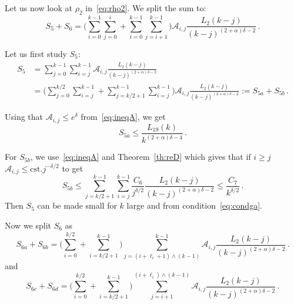 \documentclass[AHL,Unicode,longabstracts]{cedram}
\newcommand{\ga}{\alpha}
\newcommand{\gd}{\delta}
\newcommand{\cA}{\ensuremath{\mathcal{A}}}
\newcommand\cst{\mathrm{cst}}
\begin{document}
Let us now look at $\rho_2$ in~\eqref{eq:rho2}. We split the sum to:
\begin{equation}
S_5 + S_6 = \bigg(\sum_{i=0}^{k-1} \sum_{j=0}^{i} + \sum_{i=0}^{k-1} \sum_{j=i+1}^{k-1} \bigg) \cA_{i,j} \frac{L_{2}(k-j)}{(k-j)^{(2+\ga)\delta -2}}\,.
\end{equation}

Let us first study $S_5$:
\begin{equation}
\begin{split}
S_5 & = \sum_{j=0}^{k-1} \sum_{i=j}^{k-1} \cA_{i,j} \frac{L_{2}(k-j)}{(k-j)^{(2+\ga)\delta -2}} \\
& = \bigg(\sum_{j=0}^{ k/2 } \sum_{i=j}^{k-1} + \sum_{ j= k/2 +1 }^{k-1} \sum_{i=j}^{k-1} \bigg)
\cA_{i,j} \frac{L_{2}(k-j)}{(k-j)^{(2+\ga)\delta -2}} := S_{5a} + S_{5b}\,.
\end{split}
\end{equation}

Using that $\cA_{i,j} \le e^{\delta}$ from~\eqref{eq:ineqA}, we get
\begin{equation}
S_{5a} \le \frac{L_{19}(k)}{k^{(2+\ga)\delta -4 }}\,.
\end{equation}

For $S_{5b}$, we use~\eqref{eq:ineqA} and Theorem~\ref{th:reD} which gives that if $i\geq j$ $\cA_{i,j} \leq \cst. j^{-\gd/2}$ to get
\begin{equation}
S_{5b} \le \sum_{ j= k/2 +1 }^{k-1} \sum_{i=j}^{k-1} \frac{C_6}{j^{\delta/2}} \frac{L_{2}(k-j)}{(k-j)^{(2+\ga)\delta -2}} \le \frac{C_7}{k^{ \delta/2}}\,.
\end{equation}
Then $S_5$ can be made small for $k$ large and from condition~\eqref{eq:condga}.

Now we split $S_6$ as
\begin{equation}
S_{6a} + S_{6b} = \bigg(\sum_{i=0}^{ k/2 } + \sum_{i= k/2 + 1}^{k-1} \bigg) \sum_{j=(i+ \ell_i +1) \wedge (k-1)}^{k-1} \cA_{i,j} \frac{L_{2}(k-j)}{(k-j)^{(2+\ga)\delta -2}}\,.
\end{equation}
and
\begin{equation}
S_{6c} + S_{6d} = \bigg(\sum_{i=0}^{ k/2 } + \sum_{i= k/2 +1}^{k-1} \bigg) \sum_{j=i + 1}^{(i+ \ell_i) \wedge (k-1)} \cA_{i,j} \frac{L_{2}(k-j)}{(k-j)^{(2+\ga)\delta -2}}\,.
\end{equation}
\end{document}
